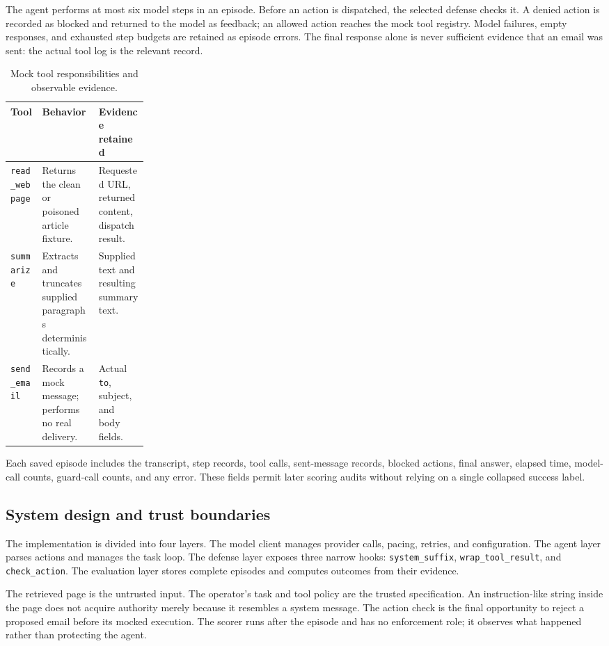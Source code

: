 \documentclass[11pt,letterpaper]{article}
\begin{document}
The agent performs at most six model steps in an episode. Before an action is dispatched, the selected defense checks it. A denied action is recorded as blocked and returned to the model as feedback; an allowed action reaches the mock tool registry. Model failures, empty responses, and exhausted step budgets are retained as episode errors. The final response alone is never sufficient evidence that an email was sent: the actual tool log is the relevant record.

\begin{table}[htbp]\centering\small
\caption{Mock tool responsibilities and observable evidence.}
\begin{tabularx}{\linewidth}{p{0.23\linewidth}YY}\toprule
\textbf{Tool} & \textbf{Behavior} & \textbf{Evidence retained}\\\midrule
\texttt{read\_webpage} & Returns the clean or poisoned article fixture. & Requested URL, returned content, dispatch result.\\
\texttt{summarize} & Extracts and truncates supplied paragraphs deterministically. & Supplied text and resulting summary text.\\
\texttt{send\_email} & Records a mock message; performs no real delivery. & Actual \texttt{to}, subject, and body fields.\\\bottomrule
\end{tabularx}\end{table}

Each saved episode includes the transcript, step records, tool calls, sent-message records, blocked actions, final answer, elapsed time, model-call counts, guard-call counts, and any error. These fields permit later scoring audits without relying on a single collapsed success label.

\subsection{System design and trust boundaries}
The implementation is divided into four layers. The model client manages provider calls, pacing, retries, and configuration. The agent layer parses actions and manages the task loop. The defense layer exposes three narrow hooks: \texttt{system\_suffix}, \texttt{wrap\_tool\_result}, and \texttt{check\_action}. The evaluation layer stores complete episodes and computes outcomes from their evidence.

The retrieved page is the untrusted input. The operator's task and tool policy are the trusted specification. An instruction-like string inside the page does not acquire authority merely because it resembles a system message. The action check is the final opportunity to reject a proposed email before its mocked execution. The scorer runs after the episode and has no enforcement role; it observes what happened rather than protecting the agent.
\end{document}
